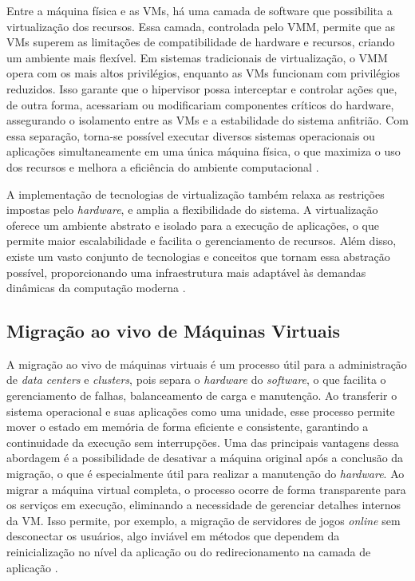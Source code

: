 \documentclass[
	12pt,				%
	oneside,			%
	a4paper,			%
	english,			%
	brazil				%
	]{abntex2ppgsi}
\begin{document}
Entre a máquina física e as VMs, há uma camada de software que possibilita a virtualização dos recursos. Essa camada, controlada pelo VMM, permite que as VMs superem as limitações de compatibilidade de hardware e recursos, criando um ambiente mais flexível. Em sistemas tradicionais de virtualização, o VMM opera com os mais altos privilégios, enquanto as VMs funcionam com privilégios reduzidos. Isso garante que o hipervisor possa interceptar e controlar ações que, de outra forma, acessariam ou modificariam componentes críticos do hardware, assegurando o isolamento entre as VMs e a estabilidade do sistema anfitrião. Com essa separação, torna-se possível executar diversos sistemas operacionais ou aplicações simultaneamente em uma única máquina física, o que maximiza o uso dos recursos e melhora a eficiência do ambiente computacional \cite{1430629}.

A implementação de tecnologias de virtualização também relaxa as restrições impostas pelo \textit{hardware}, e amplia a flexibilidade do sistema. A virtualização oferece um ambiente abstrato e isolado para a execução de aplicações, o que permite maior escalabilidade e facilita o gerenciamento de recursos. Além disso, existe um vasto conjunto de tecnologias e conceitos que tornam essa abstração possível, proporcionando uma infraestrutura mais adaptável às demandas dinâmicas da computação moderna \cite{10.5555/2531413}.

\subsection{Migração ao vivo de Máquinas Virtuais}\label{section:migracao-ao-vivo-maquinas-virtuais}

A migração ao vivo de máquinas virtuais é um processo útil para a administração de \textit{data centers} e \textit{clusters}, pois separa o \textit{hardware} do \textit{software}, o que facilita o gerenciamento de falhas, balanceamento de carga e manutenção. Ao transferir o sistema operacional e suas aplicações como uma unidade, esse processo permite mover o estado em memória de forma eficiente e consistente, garantindo a continuidade da execução sem interrupções. Uma das principais vantagens dessa abordagem é a possibilidade de desativar a máquina original após a conclusão da migração, o que é especialmente útil para realizar a manutenção do \textit{hardware}. Ao migrar a máquina virtual completa, o processo ocorre de forma transparente para os serviços em execução, eliminando a necessidade de gerenciar detalhes internos da VM. Isso permite, por exemplo, a migração de servidores de jogos \textit{online} sem desconectar os usuários, algo inviável em métodos que dependem da reinicialização no nível da aplicação ou do redirecionamento na camada de aplicação \cite{10.5555/1251203.1251223}.
\end{document}
